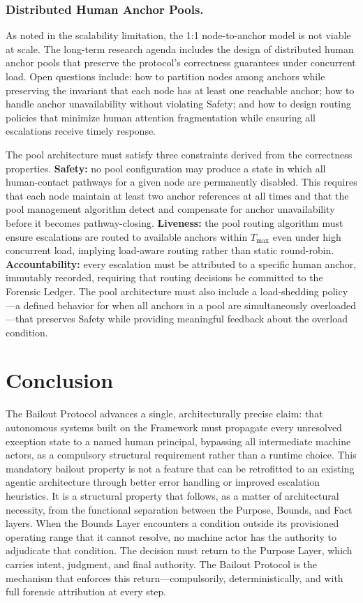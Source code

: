 \subsubsection{Distributed Human Anchor Pools.}
As noted in the scalability limitation, the 1:1 node-to-anchor model is not viable at scale. The long-term research agenda includes the design of distributed human anchor pools that preserve the protocol's correctness guarantees under concurrent load. Open questions include: how to partition nodes among anchors while preserving the invariant that each node has at least one reachable anchor; how to handle anchor unavailability without violating Safety; and how to design routing policies that minimize human attention fragmentation while ensuring all escalations receive timely response.

The pool architecture must satisfy three constraints derived from the correctness properties. \textbf{Safety:} no pool configuration may produce a state in which all human-contact pathways for a given node are permanently disabled. This requires that each node maintain at least two anchor references at all times and that the pool management algorithm detect and compensate for anchor unavailability before it becomes pathway-closing. \textbf{Liveness:} the pool routing algorithm must ensure escalations are routed to available anchors within $T_{\max}$ even under high concurrent load, implying load-aware routing rather than static round-robin. \textbf{Accountability:} every escalation must be attributed to a specific human anchor, immutably recorded, requiring that routing decisions be committed to the Forensic Ledger. The pool architecture must also include a load-shedding policy---a defined behavior for when all anchors in a pool are simultaneously overloaded---that preserves Safety while providing meaningful feedback about the overload condition.

\section{Conclusion}\label{sec:conclusion}

The Bailout Protocol advances a single, architecturally precise claim: that autonomous systems built on the \bxthree{} Framework must propagate every unresolved exception state to a named human principal, bypassing all intermediate machine actors, as a compulsory structural requirement rather than a runtime choice. This mandatory bailout property is not a feature that can be retrofitted to an existing agentic architecture through better error handling or improved escalation heuristics. It is a structural property that follows, as a matter of architectural necessity, from the functional separation between the Purpose, Bounds, and Fact layers. When the Bounds Layer encounters a condition outside its provisioned operating range that it cannot resolve, no machine actor has the authority to adjudicate that condition. The decision must return to the Purpose Layer, which carries intent, judgment, and final authority. The Bailout Protocol is the mechanism that enforces this return---compulsorily, deterministically, and with full forensic attribution at every step.

